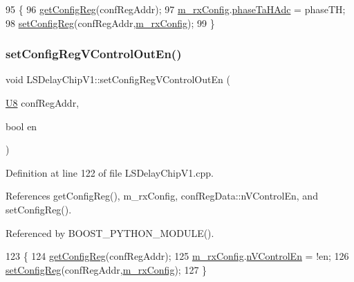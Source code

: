 \begin{DoxyCode}
95 \{
96     \hyperlink{classLSDelayChipV1_a4f338071d49df7eae55020a5f5fa8474}{getConfigReg}(confRegAddr);
97     \hyperlink{classLSDelayChipV1_a4818ac5c0d7ccf2845a01226234bdb67}{m\_rxConfig}.\hyperlink{structconfRegData_a2e471f30b32e57270cb2edb0e420cf1b}{phaseTaHAdc} = phaseTH;
98     \hyperlink{classLSDelayChipV1_a11fa2ebfa37c5cf0544ddb68c7d43e94}{setConfigReg}(confRegAddr,\hyperlink{classLSDelayChipV1_a4818ac5c0d7ccf2845a01226234bdb67}{m\_rxConfig});
99 \}
\end{DoxyCode}
\mbox{\label{classLSDelayChipV1_afd8a57dda2cd6a62607cbfc9808c3220}} 
\subsubsection{\texorpdfstring{set\+Config\+Reg\+V\+Control\+Out\+En()}{setConfigRegVControlOutEn()}}
{\footnotesize\ttfamily void L\+S\+Delay\+Chip\+V1\+::set\+Config\+Reg\+V\+Control\+Out\+En (\begin{DoxyParamCaption}\item[{\hyperlink{ICECALv3_8h_a3cb25ca6f51f003950f9625ff05536fc}{U8}}]{conf\+Reg\+Addr,  }\item[{bool}]{en }\end{DoxyParamCaption})}



Definition at line 122 of file L\+S\+Delay\+Chip\+V1.\+cpp.



References get\+Config\+Reg(), m\+\_\+rx\+Config, conf\+Reg\+Data\+::n\+V\+Control\+En, and set\+Config\+Reg().



Referenced by B\+O\+O\+S\+T\+\_\+\+P\+Y\+T\+H\+O\+N\+\_\+\+M\+O\+D\+U\+L\+E().


\begin{DoxyCode}
123 \{
124     \hyperlink{classLSDelayChipV1_a4f338071d49df7eae55020a5f5fa8474}{getConfigReg}(confRegAddr);
125     \hyperlink{classLSDelayChipV1_a4818ac5c0d7ccf2845a01226234bdb67}{m\_rxConfig}.\hyperlink{structconfRegData_a62f72429bde3ede255f6d8dfe1401c37}{nVControlEn} = !en;
126     \hyperlink{classLSDelayChipV1_a11fa2ebfa37c5cf0544ddb68c7d43e94}{setConfigReg}(confRegAddr,\hyperlink{classLSDelayChipV1_a4818ac5c0d7ccf2845a01226234bdb67}{m\_rxConfig});
127 \}
\end{DoxyCode}
\mbox{\label{classLSDelayChipV1_a01c1e85ae0d0e031164fe2d47b4f4824}} 
